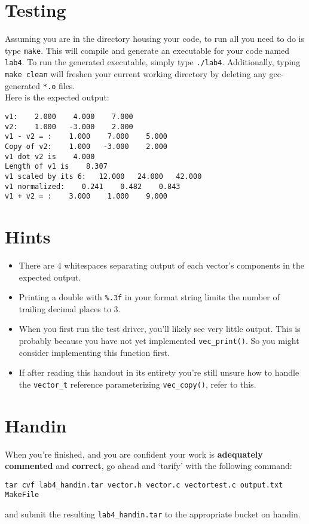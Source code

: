 \documentclass[12pt]{article}
\begin{document}
\section{Testing}

Assuming you are in the directory housing your code, to run all you need to do is type \texttt{make}. This will compile and generate an executable for your code named \texttt{lab4}. To run the generated executable, simply type \texttt{./lab4}. Additionally, typing \texttt{make clean} will freshen your current working directory by deleting any gcc-generated \texttt{*.o} files. \\

\noindent Here is the expected output:

\begin{mdframed}[backgroundcolor=light-gray, innerleftmargin=10, innertopmargin=1,innerbottommargin=1,linecolor=light-gray]
\begin{lstlisting}
v1:    2.000    4.000    7.000
v2:    1.000   -3.000    2.000
v1 - v2 = :    1.000    7.000    5.000
Copy of v2:    1.000   -3.000    2.000
v1 dot v2 is    4.000 
Length of v1 is    8.307 
v1 scaled by its 6:   12.000   24.000   42.000
v1 normalized:    0.241    0.482    0.843
v1 + v2 = :    3.000    1.000    9.000
\end{lstlisting}
\end{mdframed} 

\section{Hints}
\begin{itemize}
\item There are 4 whitespaces separating output of each vector's components in the expected output.
\item Printing a double with \texttt{\%.3f} in your format string limits the number of trailing decimal places to 3.
\item When you first run the test driver, you'll likely see very little output. This is probably because you have not yet implemented \texttt{vec\_print()}. So you might consider implementing this function first.
\item If after reading this handout in its entirety you're still unsure how to handle the \texttt{vector\_t} reference parameterizing \texttt{vec\_copy()}, refer to this.
\end{itemize}

\section{Handin}

When you're finished, and you are confident your work is \textbf{adequately commented} and \textbf{correct}, go ahead and `tarify' with the following command:
\begin{center}
\texttt{tar cvf lab4\_handin.tar vector.h vector.c vectortest.c output.txt MakeFile}
\end{center}
\noindent and submit the resulting \texttt{lab4\_handin.tar} to the appropriate bucket on handin.
\end{document}
